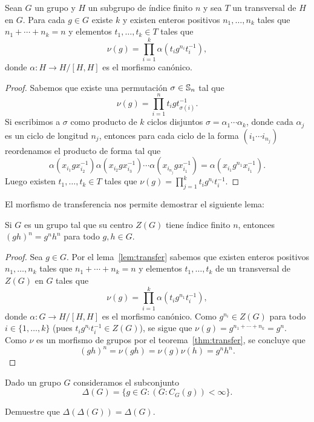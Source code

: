 \begin{lemma}
	\label{lem:transfer}
	Sean $G$ un grupo y $H$ un subgrupo de índice finito $n$ y sea $T$ un
	transversal de $H$ en $G$.  Para cada $g\in G$ existe $k$ y existen
	enteros positivos $n_1,\dots,n_k$ tales que $n_1+\cdots+n_k=n$ y elementos
	$t_1,\dots,t_k\in T$ tales que 
	\[
		\nu(g)=\prod_{i=1}^k \alpha(t_ig^{n_i}t_i^{-1}),
	\]
	donde $\alpha\colon H\to H/[H,H]$ es el morfismo canónico. 
\end{lemma}

\begin{proof}
	Sabemos que existe una permutación $\sigma\in\mathbb{S}_n$ tal que 
	\[
	\nu(g)=\prod_{i=1}^n t_igt_{\sigma(i)}^{-1}. 
	\]
	Si escribimos a $\sigma$ como producto de $k$ ciclos disjuntos
	$\sigma=\alpha_1\cdots\alpha_k$, donde cada $\alpha_j$ es un ciclo de
	longitud $n_j$,  entonces para cada ciclo de la forma $(i_1\cdots i_{n_j})$
	reordenamos el producto de forma tal que
	\[
		\alpha(x_{i_1}gx_{i_2}^{-1})\alpha(x_{i_2}gx_{i_3}^{-1})\cdots \alpha(x_{i_{n_j}}gx_{i_1}^{-1})=\alpha(x_{i_1}g^{n_1}x_{i_1}^{-1}).
	\]
	Luego existen $t_1,\dots,t_k\in T$ tales que
	$\nu(g)=\prod_{j=1}^k t_ig^{n_i}t_i^{-1}$. 
\end{proof}

El morfismo de transferencia nos permite demostrar el siguiente
lema:

\begin{lemma}
	\label{lem:center}
	Si $G$ es un grupo tal que su centro $Z(G)$ tiene índice finito $n$, entonces
	$(gh)^n=g^nh^n$ para todo $g,h\in G$.	
\end{lemma}

\begin{proof}
	Sea $g\in G$.  Por el lema~\ref{lem:transfer} sabemos que existen enteros
	positivos $n_1,\dots,n_k$ tales que $n_1+\cdots+n_k=n$ y elementos
	$t_1,\dots,t_k$ de un transversal de $Z(G)$ en $G$ tales que 
	\[
		\nu(g)=\prod_{i=1}^k \alpha(t_ig^{n_1}t_i^{-1}),
	\]
	donde $\alpha\colon G\to H/[H,H]$ es el morfismo canónico.  Como
	$g^{n_i}\in Z(G)$ para todo $i\in\{1,\dots,k\}$ (pues $t_ig^{n_i}t_i^{-1}\in Z(G)$), se sigue que
	$\nu(g)=g^{n_1+\cdots+n_k}=g^n$.  Como $\nu$ es un morfismo de
	grupos por el teorema~\ref{thm:transfer}, se concluye que
	\[
		(gh)^n=\nu(gh)=\nu(g)\nu(h)=g^nh^n. 
	\]
\end{proof}

Dado un grupo $G$ consideramos 
el subconjunto
\[
	\Delta(G)=\{g\in G:(G:C_G(g))<\infty\}.
\]

\begin{exercise}
	Demuestre que $\Delta(\Delta(G))=\Delta(G)$.
\end{exercise}

